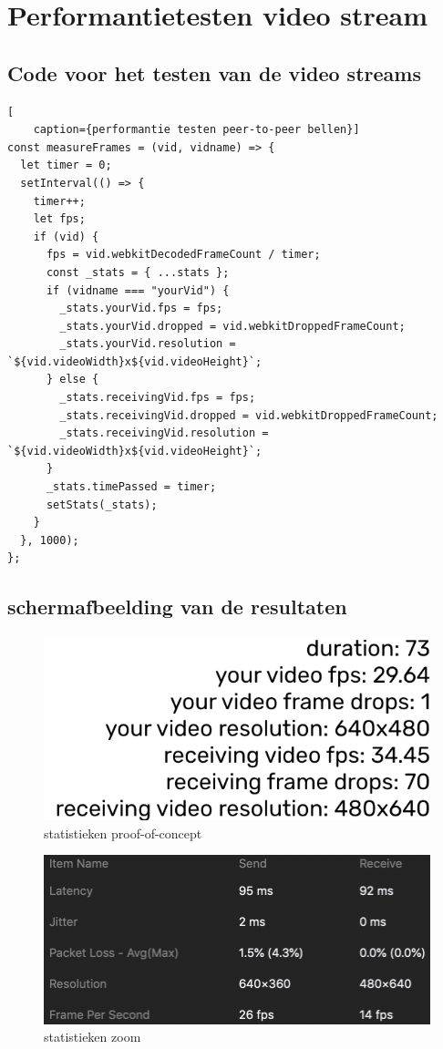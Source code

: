 
\chapter{Performantietesten video stream}

\section{Code voor het testen van de video streams}

\begin{lstlisting}[
	caption={performantie testen peer-to-peer bellen}]
const measureFrames = (vid, vidname) => {
  let timer = 0;
  setInterval(() => {
    timer++;
    let fps;
    if (vid) {
      fps = vid.webkitDecodedFrameCount / timer;
      const _stats = { ...stats };
      if (vidname === "yourVid") {
        _stats.yourVid.fps = fps;
        _stats.yourVid.dropped = vid.webkitDroppedFrameCount;
        _stats.yourVid.resolution = `${vid.videoWidth}x${vid.videoHeight}`;
      } else {
        _stats.receivingVid.fps = fps;
        _stats.receivingVid.dropped = vid.webkitDroppedFrameCount;
        _stats.receivingVid.resolution = `${vid.videoWidth}x${vid.videoHeight}`;
      }
      _stats.timePassed = timer;
      setStats(_stats);
    }
  }, 1000);
};
\end{lstlisting}

\section{schermafbeelding van de resultaten}
\begin{figure}[H]
	\centering
	\includegraphics[width=120mm]{./img/statsPWA}		
	\caption{statistieken proof-of-concept}
\end{figure}

\begin{figure}[H]
	\centering
	\includegraphics[width=120mm]{./img/statsZoom}		
	\caption{statistieken zoom}
\end{figure}